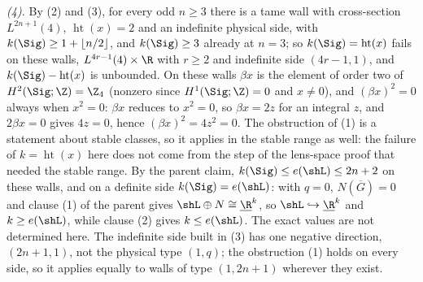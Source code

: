 \emph{(4).} By (2) and (3), for every odd $n \geq 3$ there is a tame wall with cross-section $L^{2n+1}(4)$, $\operatorname{ht}(x) = 2$ and an indefinite physical side, with $k(\Sig) \geq 1 + \lfloor n/2 \rfloor$, and $k(\Sig) \geq 3$ already at $n = 3$; so $k(\Sig) = \operatorname{ht}(x)$ fails on these walls, $L^{4r-1}(4) \times \R$ with $r \geq 2$ and indefinite side $(4r-1, 1)$, and $k(\Sig) - \operatorname{ht}(x)$ is unbounded. On these walls $\beta x$ is the element of order two of $H^{2}(\Sig; \Z) = \Z_{4}$ (nonzero since $H^{1}(\Sig; \Z) = 0$ and $x \neq 0$), and $(\beta x)^{2} = 0$ always when $x^{2} = 0$: $\beta x$ reduces to $x^{2} = 0$, so $\beta x = 2z$ for an integral $z$, and $2\beta x = 0$ gives $4z = 0$, hence $(\beta x)^{2} = 4z^{2} = 0$. The obstruction of (1) is a statement about stable classes, so it applies in the stable range as well: the failure of $k = \operatorname{ht}(x)$ here does not come from the step of the lens-space proof that needed the stable range. By the parent claim, $k(\Sig) \leq e(\shL) \leq 2n + 2$ on these walls, and on a definite side $k(\Sig) = e(\shL)$: with $q = 0$, $N(\overline G) = 0$ and clause (1) of the parent gives $\shL \oplus N \cong \underline{\R}^{k}$, so $\shL \hookrightarrow \underline{\R}^{k}$ and $k \geq e(\shL)$, while clause (2) gives $k \leq e(\shL)$. The exact values are not determined here. The indefinite side built in (3) has one negative direction, $(2n+1, 1)$, not the physical type $(1, q)$; the obstruction (1) holds on every side, so it applies equally to walls of type $(1, 2n+1)$ wherever they exist.
